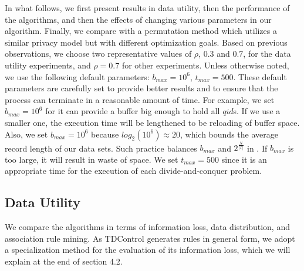 In what follows, we first present results in data utility, then the
performance of the algorithms, and then the effects of
changing various parameters in our algorithm.
Finally, we compare with a permutation method which utilizes
a similar privacy model but with different optimization goals.
Based on previous observations, we choose two representative values of $\rho$,
$0.3$ and $0.7$, for the data utility experiments, and $\rho=0.7$ for other experiments.
Unless otherwise noted, we use the following default parameters:
$b_{max} = 10^6$, $t_{max}=500$. These default
parameters are carefully set to provide better results
and to ensure that the process can terminate in a reasonable
amount of time.
For example, we set $b_{max} = 10^6$ for it can provide a buffer
big enough to hold all $qid$s. If we use a smaller one,
the execution time will be lengthened to be reloading of buffer
space. Also, we set $b_{max} = 10^6$ because $log_2(10^6) \approx 20$, 
which bounds the average record length of our data sets.
Such practice balances $b_{max}$ and ${2^{\frac{N}{|T|}}}$ 
in .
If $b_{max}$ is too large, it will result in waste of
space. We set $t_{max} = 500$ since it is an appropriate time
for the execution of each divide-and-conquer problem.

\subsection{Data Utility}\label{sec:eval:datautility}
We compare the algorithms in terms of information loss, data distribution,
and association rule mining. As TDControl generates rules in general form,
we adopt a specialization method for the evaluation of its information loss,
which we will explain at the end of section 4.2.

